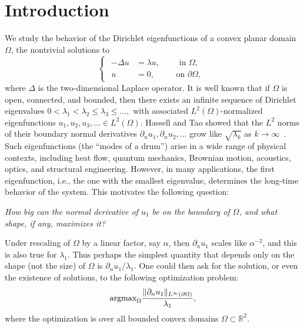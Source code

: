 \documentclass{amsart}
\theoremstyle{plain}
\begin{document}
\section{Introduction}
We study the behavior of the Dirichlet eigenfunctions of a convex planar domain $\Omega$,
the nontrivial solutions to
\begin{equation}
  \begin{cases}
    \begin{aligned}
    -\Delta u &= \lambda u, \qquad \mbox{ in } \Omega,\\
    u &= 0,  \;\qquad \mbox{ on } \partial \Omega,
    \end{aligned}
    \end{cases}
    \label{eqn: bvp equation for u}
\end{equation}
where $\Delta$ is the two-dimensional Laplace operator.
It is well known that if $\Omega$ is open, connected, and bounded, then there exists an infinite sequence of Dirichlet eigenvalues $0<\lambda_1<\lambda_2\le \lambda_3 \le \dots,$ with associated $L^2(\Omega)$-normalized eigenfunctions $u_1,u_2,u_3,\dots\in L^2(\Omega)$.
Hassell and Tao showed that the $L^2$ norms of their boundary normal derivatives $\partial_n u_1,\partial_n u_2,\dots$ grow like $\sqrt{\lambda_k}$ as $k\to\infty$~\cite{hassell2002upper}.
Such eigenfunctions (the ``modes of a drum'') arise in a wide range of physical contexts, including heat flow, quantum mechanics, Brownian motion, acoustics, optics, and structural engineering.
However, in many applications, the first eigenfunction, i.e., the one with the smallest eigenvalue, determines the long-time behavior of the system. This motivates the following question:
\begin{center}
{\it How big can the normal derivative of $u_1$ be on the boundary of $\Omega$, and what shape, if any, maximizes it?}
\end{center}
Under rescaling of $\Omega$ by a linear factor, say $\alpha$,
then $\partial_n u_1$ scales like $\alpha^{-2}$,
and this is also true for $\lambda_1$.
Thus perhaps the simplest quantity that depends only on the shape (not the size)
of $\Omega$ is $\partial_n u_1/\lambda_1$.
One could then ask for the solution, or even the existence of solutions, to the following optimization problem:
$${\rm argmax}_{\Omega} \frac{\|\partial_n u_1\|_{L^\infty(\partial \Omega)}}{\lambda_1},$$
where the optimization is over all bounded convex domains $\Omega\subset\mathbb{R}^2$.
\end{document}
